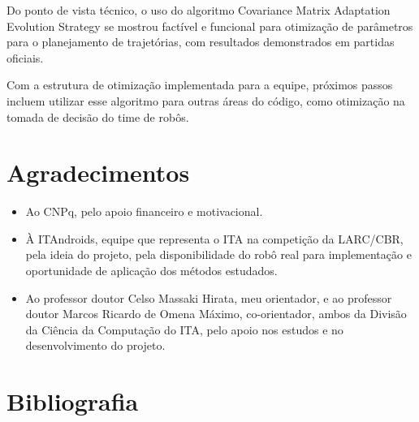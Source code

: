\documentclass[a4paper,12pt]{article}
\begin{document}
Do ponto de vista técnico, o uso do algoritmo Covariance Matrix Adaptation Evolution Strategy se mostrou factível e funcional para otimização de parâmetros para o planejamento de trajetórias, com resultados demonstrados em partidas oficiais.

Com a estrutura de otimização implementada para a equipe, próximos passos incluem utilizar esse algoritmo para outras áreas do código, como otimização na tomada de decisão do time de robôs.

\section{Agradecimentos}

\begin{itemize}
\item Ao CNPq, pelo apoio financeiro e motivacional.
\item À ITAndroids, equipe que representa o ITA na competição da LARC/CBR, pela ideia do projeto, pela disponibilidade do robô real para implementação e oportunidade de aplicação dos métodos estudados.
\item Ao professor doutor Celso Massaki Hirata, meu orientador, e ao professor doutor Marcos Ricardo de Omena Máximo, co-orientador, ambos da Divisão da Ciência da Computação do ITA, pelo apoio nos estudos e no desenvolvimento do projeto.

\end{itemize}

\section{Bibliografia}

\printbibliography
\end{document}
